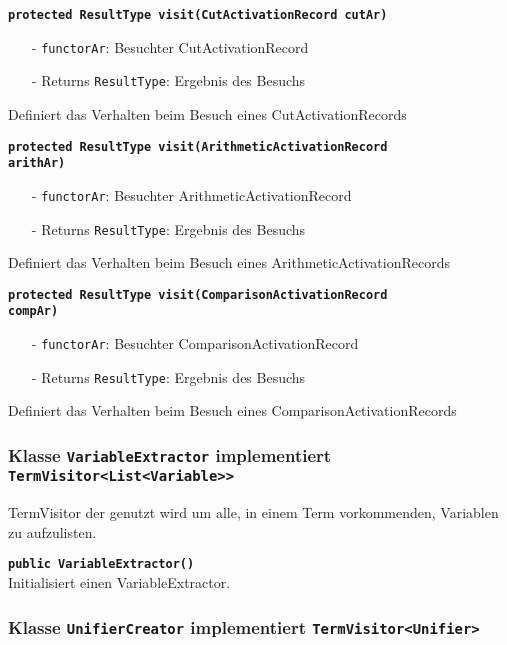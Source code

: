 \documentclass[parskip=full,11pt,twoside]{scrartcl}
\begin{document}
\textbf{\texttt{protected ResultType visit(CutActivationRecord cutAr)}}
\begin{itemize}[noitemsep]
	\item[-] \texttt{functorAr}: Besuchter CutActivationRecord
	\item[-] Returns \texttt{ResultType}: Ergebnis des Besuchs
\end{itemize}
Definiert das Verhalten beim Besuch eines CutActivationRecords

\textbf{\texttt{protected ResultType visit(ArithmeticActivationRecord\\arithAr)}}
\begin{itemize}[noitemsep]
	\item[-] \texttt{functorAr}: Besuchter ArithmeticActivationRecord
	\item[-] Returns \texttt{ResultType}: Ergebnis des Besuchs
\end{itemize}
Definiert das Verhalten beim Besuch eines ArithmeticActivationRecords

\textbf{\texttt{protected ResultType visit(ComparisonActivationRecord\\compAr)}}
\begin{itemize}[noitemsep]
	\item[-] \texttt{functorAr}: Besuchter ComparisonActivationRecord
	\item[-] Returns \texttt{ResultType}: Ergebnis des Besuchs
\end{itemize}
Definiert das Verhalten beim Besuch eines ComparisonActivationRecords

\subsubsection{Klasse \texttt{VariableExtractor} implementiert \texttt{TermVisitor<List<Variable>{}>}}

TermVisitor der genutzt wird um alle, in einem Term vorkommenden, Variablen zu aufzulisten.

\textbf{\texttt{public VariableExtractor()}}\\
Initialisiert einen VariableExtractor.

\subsubsection{Klasse \texttt{UnifierCreator} implementiert \texttt{TermVisitor<Unifier>}}
\end{document}
